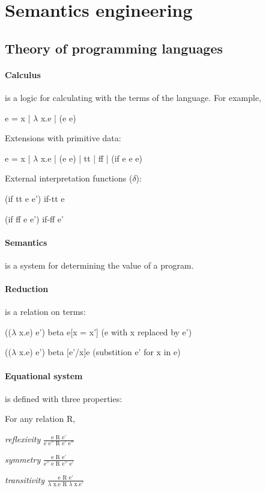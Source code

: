 \section{Semantics engineering}

\subsection{Theory of programming languages}

\paragraph{Calculus} is a logic for calculating with the terms of the language.
For example,

\centerline{e = x | $\lambda$ x.e | (e e)}

Extensions with primitive data:

\centerline{e = x | $\lambda$ x.e | (e e) | tt | ff | (if e e e)}

External interpretation functions ($\delta$):

\centerline{(if tt e e') if-tt e}

\centerline{(if ff e e') if-ff e'}

\paragraph{Semantics} is a system for determining the value of a program.

\paragraph{Reduction} is a relation on terms:

\centerline{(($\lambda$ x.e) e') beta e[x = x'] (e with x replaced by e')}

\centerline{(($\lambda$ x.e) e') beta [e'/x]e (substition e' for x in e)}

\paragraph{Equational system} is defined with three properties:

For any relation R,

\begin{multicols}{3}
\textit{reflexivity}
$\frac{\text{e R e'}}{\text{e e'' R e' e''}}$

\textit{symmetry}
$\frac{\text{e R e'}}{\text{e'' e R e'' e'}}$

\textit{transitivity}
$\frac{\text{e R e'}}{\text{$\lambda$ x.e R $\lambda$ x.e'}}$
\end{multicols}

